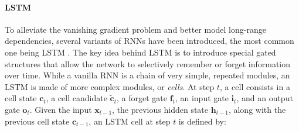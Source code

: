 





\paragraph{\ac{LSTM}}

To alleviate the vanishing gradient problem and better model long-range dependencies, several variants of \acp{RNN} have been introduced, the most common one being \ac{LSTM} \citep{hochreiter1997long}. The key idea behind \ac{LSTM} is to introduce special gated structures that allow the network to selectively remember or forget information over time. While a vanilla \ac{RNN} is a chain of very simple, repeated modules, an \ac{LSTM} is made of more complex modules, or \textit{cells}. At step $t$, a cell consists in a cell state $\bm{c}_t$, a cell candidate $\tilde{\bm{c}}_t$, a forget gate $\bm{f}_t$, an input gate $\bm{i}_t$, and an output gate $\bm{o}_t$. Given the input $\bm{x}_{t-1}$, the previous hidden state $\bm{h}_{t-1}$, along with the previous cell state $\bm{c}_{t-1}$, an \ac{LSTM} cell at step $t$ is defined by:

